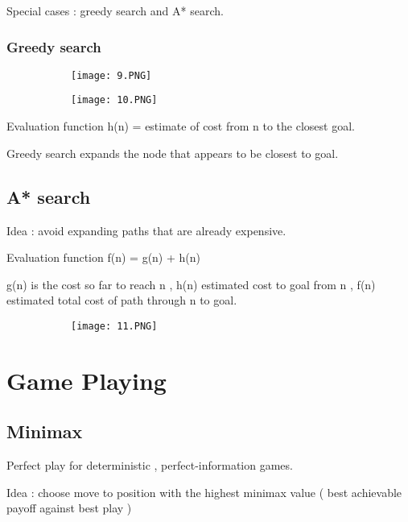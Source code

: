 \documentclass{article}
\begin{document}
Special cases : greedy search and A* search.

\subsubsection{Greedy search}

\begin{figure}[ht!]
  \centering
  \begin{subfigure}[b]{0.4\linewidth}
    \texttt{[image: 9.PNG]}
  \end{subfigure}
     \begin{subfigure}[b]{0.59\textwidth}
         \centering
         \texttt{[image: 10.PNG]}
     \end{subfigure}
\end{figure}

Evaluation function h(n) = estimate of cost from n to the closest goal.

Greedy search expands the node that appears to be closest to goal.

\subsection{A* search}

Idea : avoid expanding paths that are already expensive.

Evaluation function f(n) = g(n) + h(n) 

g(n) is the cost so far to reach n , h(n) estimated cost to goal from n , f(n) estimated total cost of path through n to goal.

\begin{figure}[ht!]
  \centering
  \begin{subfigure}[b]{0.6\linewidth}
    \texttt{[image: 11.PNG]}
  \end{subfigure}
\end{figure}

\section{Game Playing}
\subsection{Minimax}

Perfect play for deterministic , perfect-information games.

Idea : choose move to position with the highest minimax value ( best achievable payoff against best play )
\end{document}
